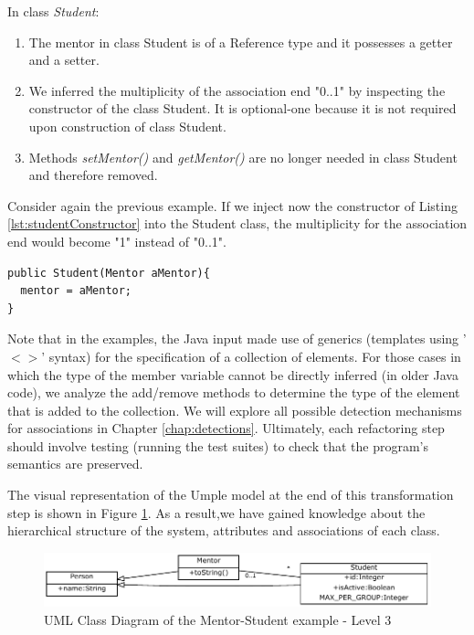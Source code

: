 In class \textit{Student}:
\begin{enumerate}

\item The mentor in class Student is of a Reference type and it possesses a getter and a setter.
\item We inferred the multiplicity of the association end "0..1" by inspecting the constructor of the class Student. It is optional-one because it is not required upon construction of class Student. 
\item Methods \textit{setMentor()} and \textit{getMentor()} are no longer needed in class Student and therefore removed.
\end{enumerate}

Consider again the previous example.  If we inject now the constructor of Listing \ref{lst:studentConstructor} into the Student class, the multiplicity for the association end would become "1" instead of "0..1". 

\begin{lstlisting}[style=java,caption=A new constructor added to Student class,label=lst:studentConstructor]
public Student(Mentor aMentor){
  mentor = aMentor;
}
\end{lstlisting}

Note that in the examples, the Java input made use of generics (templates using '$<>$' syntax) for the specification of a collection of elements. For those cases in which the type of the member variable cannot be directly inferred (in older Java code), we analyze the add/remove methods to determine the type of the element that is added to the collection. We will explore all possible detection mechanisms for associations in Chapter \ref{chap:detections}. Ultimately, each refactoring step should involve testing (running the test suites) to check that the program's semantics are preserved. 

The visual representation of the Umple model at the end of this transformation step is shown in Figure \ref{fig:Example1a3}. As a result,we have gained knowledge about the hierarchical structure of the system, attributes and associations of each class. 

\begin{figure}[h]
\centering
\includegraphics{Figures/Example1a3.pdf} 
\caption{UML Class Diagram of the Mentor-Student example - Level 3}
\label{fig:Example1a3}
\end{figure}

